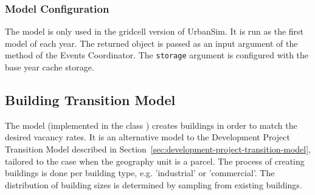 \subsubsection{Model Configuration}
%
The model is only used in the gridcell version of UrbanSim. 
It is run as the first model of each year.
The returned object is passed as an input argument of the  method of the 
Events Coordinator. The \verb|storage| argument is configured with 
the base year cache storage.
%

%
\subsection{Building Transition Model}
%
\label{sec:building-transition-model}
%

The model (implemented in the class ) 
creates buildings in order to match the desired vacancy rates. 
It is an alternative model to the Development Project Transition Model
described in Section~\ref{sec:development-project-transition-model}, tailored to the case when 
the geography unit is a parcel. The process of creating buildings is done 
per building type, e.g.  'industrial' or
'commercial'.  The distribution of building sizes is determined by sampling from 
existing buildings.

